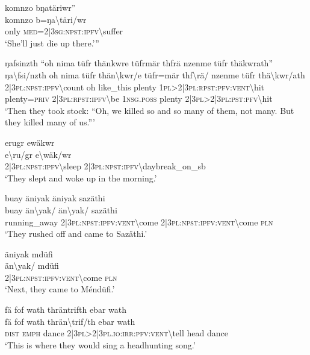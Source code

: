 \ea\label{ex:5:a1591}
komnzo bŋatäriwr''\\
\gll komnzo	b=ŋa{\textbackslash}täri/wr\\
     only	\textsc{med}=2|3\textsc{sg}:\textsc{npst}:\textsc{ipfv}{\textbackslash}suffer\\
\glt `She'll just die up there.'''
\z

\ea\label{ex:5:a1592}
ŋafsinzth ``oh nima tüfr thänkwre tüfrmär thfrä nzenme tüfr thäkwrath''\\
\gll ŋa{\textbackslash}fsi/nzth	oh	nima	tüfr	thän{\textbackslash}kwr/e	tüfr=mär	thf{\textbackslash}rä/	nzenme	tüfr	thä{\textbackslash}kwr/ath\\
     2|3\textsc{pl}:\textsc{npst}:\textsc{ipfv}{\textbackslash}count	oh	like\_this	plenty	1\textsc{pl}>2|3\textsc{pl}:\textsc{rpst}:\textsc{pfv}:\textsc{vent}{\textbackslash}hit	plenty=\textsc{priv}	2|3\textsc{pl}:\textsc{rpst}:\textsc{ipfv}{\textbackslash}be	1\textsc{nsg}.\textsc{poss}	plenty	2|3\textsc{pl}>2|3\textsc{pl}:\textsc{pst}:\textsc{pfv}{\textbackslash}hit\\
\glt `Then they took stock: ``Oh, we killed so and so many of them, not many. But they killed many of us.'''
\z

\ea\label{ex:5:a1594}
erugr ewäkwr\\
\gll e{\textbackslash}ru/gr	e{\textbackslash}wäk/wr\\
     2|3\textsc{pl}:\textsc{npst}:\textsc{ipfv}{\textbackslash}sleep	2|3\textsc{pl}:\textsc{npst}:\textsc{ipfv}{\textbackslash}daybreak\_on\_sb\\
\glt `They slept and woke up in the morning.'
\z

\ea\label{ex:5:a1595}
buay äniyak äniyak sazäthi\\
\gll buay	än{\textbackslash}yak/	än{\textbackslash}yak/	sazäthi\\
     running\_away	2|3\textsc{pl}:\textsc{npst}:\textsc{ipfv}:\textsc{vent}{\textbackslash}come	2|3\textsc{pl}:\textsc{npst}:\textsc{ipfv}:\textsc{vent}{\textbackslash}come	\textsc{pln}\\
\glt `They rushed off and came to Sazäthi.'
\z

\ea\label{ex:5:a1596}
äniyak mdüfi\\
\gll än{\textbackslash}yak/	mdüfi\\
     2|3\textsc{pl}:\textsc{npst}:\textsc{ipfv}:\textsc{vent}{\textbackslash}come	\textsc{pln}\\
\glt `Next, they came to Méndüfi.'
\z

\ea\label{ex:5:a1598}
fä fof wath thräntrifth ebar wath\\
\gll fä	fof	wath	thrän{\textbackslash}trif/th	ebar	wath\\
     \textsc{dist}	\textsc{emph}	dance	2|3\textsc{pl}>2|3\textsc{pl}.\textsc{io}:\textsc{irr}:\textsc{pfv}:\textsc{vent}{\textbackslash}tell	head	dance\\
\glt `This is where they would sing a headhunting song.'
\z

